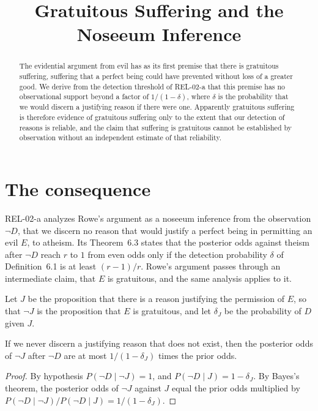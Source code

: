\documentclass{situationist-preprint}
\title{Gratuitous Suffering and the Noseeum Inference}
\begin{document}
\maketitle

\begin{abstract}
The evidential argument from evil has as its first premise that there is gratuitous suffering, suffering that a perfect being could have prevented without loss of a greater good. We derive from the detection threshold of REL-02-a that this premise has no observational support beyond a factor of $1/(1-\delta)$, where $\delta$ is the probability that we would discern a justifying reason if there were one. Apparently gratuitous suffering is therefore evidence of gratuitous suffering only to the extent that our detection of reasons is reliable, and the claim that suffering is gratuitous cannot be established by observation without an independent estimate of that reliability.
\end{abstract}

\section{The consequence}

REL-02-a analyzes Rowe's argument \citep{Rowe1979} as a noseeum inference \citep{Wykstra1984} from the observation $\neg D$, that we discern no reason that would justify a perfect being in permitting an evil $E$, to atheism. Its Theorem~6.3 states that the posterior odds against theism after $\neg D$ reach $r$ to $1$ from even odds only if the detection probability $\delta$ of Definition~6.1 is at least $(r-1)/r$. Rowe's argument passes through an intermediate claim, that $E$ is gratuitous, and the same analysis applies to it.

Let $J$ be the proposition that there is a reason justifying the permission of $E$, so that $\neg J$ is the proposition that $E$ is gratuitous, and let $\delta_J$ be the probability of $D$ given $J$.

\begin{proposition}\label{p:grat}
If we never discern a justifying reason that does not exist, then the posterior odds of $\neg J$ after $\neg D$ are at most $1/(1-\delta_J)$ times the prior odds.
\end{proposition}

\begin{proof}
By hypothesis $P(\neg D \mid \neg J) = 1$, and $P(\neg D \mid J) = 1 - \delta_J$. By Bayes's theorem, the posterior odds of $\neg J$ against $J$ equal the prior odds multiplied by $P(\neg D \mid \neg J)/P(\neg D \mid J) = 1/(1-\delta_J)$.
\end{proof}
\end{document}
